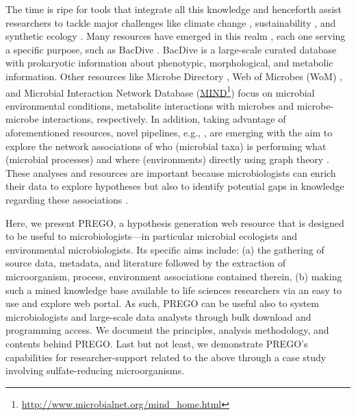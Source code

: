    The time is ripe for tools that integrate all this knowledge and henceforth assist researchers to tackle major challenges like climate change \citep{cavicchioli2019scientists}, 
   sustainability \citep{d2021microbiome}, 
   and synthetic ecology \citep{conde2020synthetic}.
   Many resources have emerged in this realm \citep{baltoumas2021biomolecule}, 
   each one serving a specific purpose, such as BacDive \citep{reimer2019bac}. 
   BacDive is a large-scale curated database with prokaryotic information about phenotypic, morphological, and metabolic information. 
   Other resources like Microbe Directory \citep{shaaban2018microbe}, 
   Web of Microbes (WoM) \citep{kosina2018web}, 
   and Microbial Interaction Network Database (\href{http://www.microbialnet.org/mind_home.html}{MIND}\footnote{
      \href{http://www.microbialnet.org/mind_home.html}{http://www.microbialnet.org/mind\_home.html}
   }) focus on microbial environmental conditions, metabolite interactions with microbes and microbe-microbe interactions, respectively. 
   In addition, taking advantage of aforementioned resources, novel pipelines, e.g., \citep{tang2020tripartite}, are emerging with the aim to explore the network associations of who (microbial taxa) is performing what (microbial processes) and where (environments) directly using graph theory \citep{koutrouli2020guide}. 
   These analyses and resources are important because microbiologists can enrich their data to explore hypotheses but also to identify potential gaps in knowledge regarding these associations \citep{li2021microbial}.

   Here, we present PREGO, a hypothesis generation web resource that is designed to be useful to microbiologists—in particular microbial ecologists and environmental microbiologists. 
   Its specific aims include: 
   (a) the gathering of source data, metadata, and literature followed by the extraction of microorganism, process, environment associations contained therein, 
   (b) making such a mined knowledge base available to life sciences researchers via an easy to use and explore web portal. 
   As such, PREGO can be useful also to system microbiologists and large-scale data analysts through bulk download and programming access. 
   We document the principles, analysis methodology, and contents behind PREGO. 
   Last but not least, we demonstrate PREGO's capabilities for researcher-support related to the above through a case study involving sulfate-reducing microorganisms.




